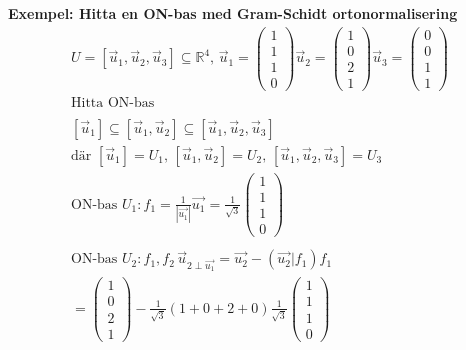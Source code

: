\textbf{Exempel: Hitta en ON-bas med Gram-Schidt ortonormalisering}
\begin{align*}
  &\quad  U = [\vec{u}_1, \vec{u}_2, \vec{u}_3] \subseteq \mathbb{R}^4 , \,
  \vec{u}_1 = \begin{pmatrix} 1 \\ 1 \\ 1 \\ 0 \end{pmatrix}
  \vec{u}_2 = \begin{pmatrix} 1 \\ 0 \\ 2 \\ 1 \end{pmatrix}
  \vec{u}_3 = \begin{pmatrix} 0 \\ 0 \\ 1 \\ 1 \end{pmatrix} \\
  &\quad  \text{Hitta ON-bas} \\
  &\quad  \\
  &\quad  [\vec{u}_1] \subseteq [\vec{u}_1, \vec{u}_2] \subseteq [\vec{u}_1, \vec{u}_2, \vec{u}_3] \\
  &\quad  \text{där } [\vec{u}_1] = U_1, \, [\vec{u}_1, \vec{u}_2] = U_2, \, [\vec{u}_1, \vec{u}_2, \vec{u}_3] = U_3
  &\quad  \\
  &\quad  \text{ON-bas } U_1: f_1 = \frac{1}{|\vec{u_1}|} \vec{u_1} =
  \frac{1}{\sqrt{3}}\begin{pmatrix} 1 \\ 1 \\ 1 \\ 0 \end{pmatrix}  \\
  &\quad  \\
  &\quad  \text{ON-bas } U_2: f_1,f_2 \, \vec{u}_{2\perp\vec{u_1}} = \vec{u_2} - (\vec{u_2}|f_1)f_1 \\
  &\quad  = \begin{pmatrix} 1 \\ 0 \\ 2 \\ 1 \end{pmatrix} -
  \frac{1}{\sqrt{3}}(1+0+2+0)\frac{1}{\sqrt{3}}\begin{pmatrix} 1 \\ 1 \\ 1 \\ 0 \end{pmatrix} \\

\end{align*}
